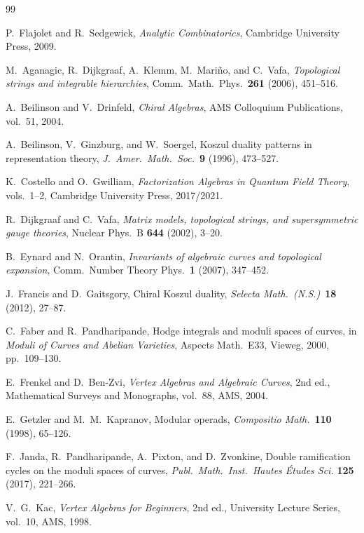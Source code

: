 \documentclass[11pt,reqno]{amsart}
\theoremstyle{definition}
\theoremstyle{remark}
\numberwithin{equation}{section}
\begin{document}
\begin{thebibliography}{99}

P.~Flajolet and R.~Sedgewick,
\emph{Analytic Combinatorics},
Cambridge University Press, 2009.

M.~Aganagic, R.~Dijkgraaf, A.~Klemm, M.~Mari\~no, and
C.~Vafa,
\emph{Topological strings and integrable hierarchies},
Comm.\ Math.\ Phys.\ \textbf{261} (2006), 451--516.

A.~Beilinson and V.~Drinfeld,
\emph{Chiral Algebras},
AMS Colloquium Publications, vol.~51, 2004.

A.~Beilinson, V.~Ginzburg, and W.~Soergel,
Koszul duality patterns in representation theory,
\emph{J.~Amer.\ Math.\ Soc.}~\textbf{9} (1996), 473--527.

K.~Costello and O.~Gwilliam,
\emph{Factorization Algebras in Quantum Field Theory},
vols.~1--2, Cambridge University Press, 2017/2021.

R.~Dijkgraaf and C.~Vafa,
\emph{Matrix models, topological strings, and
supersymmetric gauge theories},
Nuclear Phys.\ B \textbf{644} (2002), 3--20.

B.~Eynard and N.~Orantin,
\emph{Invariants of algebraic curves and topological
expansion},
Comm.\ Number Theory Phys.\ \textbf{1} (2007), 347--452.

J.~Francis and D.~Gaitsgory,
Chiral Koszul duality,
\emph{Selecta Math.\ (N.S.)}~\textbf{18} (2012), 27--87.

C.~Faber and R.~Pandharipande,
Hodge integrals and moduli spaces of curves,
in \emph{Moduli of Curves and Abelian Varieties},
Aspects Math.~E33, Vieweg, 2000, pp.~109--130.

E.~Frenkel and D.~Ben-Zvi,
\emph{Vertex Algebras and Algebraic Curves},
2nd ed., Mathematical Surveys and Monographs, vol.~88,
AMS, 2004.

E.~Getzler and M.~M.~Kapranov,
Modular operads,
\emph{Compositio Math.}~\textbf{110} (1998), 65--126.

F.~Janda, R.~Pandharipande, A.~Pixton, and D.~Zvonkine,
Double ramification cycles on the moduli spaces of curves,
\emph{Publ.\ Math.\ Inst.\ Hautes \'Etudes Sci.}
\textbf{125} (2017), 221--266.

V.~G.~Kac,
\emph{Vertex Algebras for Beginners},
2nd ed., University Lecture Series, vol.~10, AMS, 1998.


\end{thebibliography}
\end{document}
